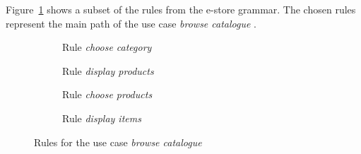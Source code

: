 \begin{example} Figure~\ref{fig:tests:grammar} shows a subset of the rules from the e-store grammar. The chosen rules represent the main path of the use case \emph{browse catalogue} . 

\begin{figure}[!ht]
  \centering
  \begin{subfigure}[t]{.5\textwidth}
    \centerline{}
    \caption{Rule \emph{choose category}}
  \end{subfigure}
  \begin{subfigure}[t]{.5\textwidth}
    \centerline{}
    \caption{Rule \emph{display products}}
  \end{subfigure}
  \begin{subfigure}[t]{.5\textwidth}
    \centerline{}
    \caption{Rule \emph{choose products}}
  \end{subfigure}
  \begin{subfigure}[t]{.5\textwidth}
    \centerline{}
    \caption{Rule \emph{display items}}
  \end{subfigure}
  \caption{Rules for the use case \emph{browse catalogue}}\label{fig:tests:grammar}
\end{figure}


\end{example}
